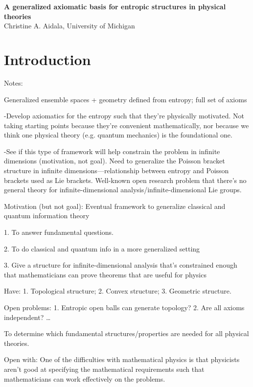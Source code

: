 \begin{center}
	\textbf{A generalized axiomatic basis for entropic structures in physical theories} \\
	Christine A. Aidala, University of Michigan
\end{center}

\section{Introduction}

Notes:

Generalized ensemble spaces + geometry defined from entropy; full set of axioms

-Develop axiomatics for the entropy such that they’re physically motivated.  Not taking starting points because they’re convenient mathematically, nor because we think one physical theory (e.g. quantum mechanics) is the foundational one.

-See if this type of framework will help constrain the problem in infinite dimensions (motivation, not goal).  Need to generalize the Poisson bracket structure in infinite dimensions—relationship between entropy and Poisson brackets used as Lie brackets.  Well-known open research problem that there’s no general theory for infinite-dimensional analysis/infinite-dimensional Lie groups.

Motivation (but not goal): Eventual framework to generalize classical and quantum information theory

1. To answer fundamental questions.

2. To do classical and quantum info in a more generalized setting

3. Give a structure for infinite-dimensional analysis that’s constrained enough that mathematicians can prove theorems that are useful for physics

Have: 1. Topological structure; 2. Convex structure; 3. Geometric structure.  

Open problems: 1. Entropic open balls can generate topology? 2. Are all axioms independent?   …

To determine which fundamental structures/properties are needed for all physical theories.

Open with: One of the difficulties with mathematical physics is that physicists aren’t good at specifying the mathematical requirements such that mathematicians can work effectively on the problems.

